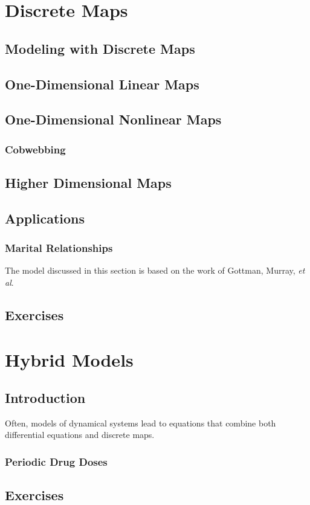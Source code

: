 \documentclass{book}
\begin{document}
%
\chapter{Discrete Maps}
\section{Modeling with Discrete Maps}
\section{One-Dimensional Linear Maps}
\section{One-Dimensional Nonlinear Maps}
\subsection{Cobwebbing}
\section{Higher Dimensional Maps}
\section{Applications}
\subsection{Marital Relationships}
The model discussed in this section is based on the
work of Gottman, Murray, \emph{et al}\cite{GM}.
\section{Exercises}
\chapter{Hybrid Models}
\section{Introduction}
Often, models of dynamical systems lead to equations that combine
both differential equations and discrete maps.
\subsection{Periodic Drug Doses}
\section{Exercises}
%
\end{document}
